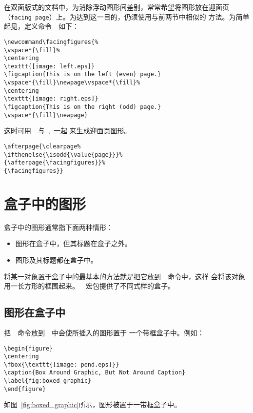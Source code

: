 在双面版式的文档中，为消除浮动图形间差别，常常希望将图形放在迎面页
（\texttt{facing page}）上。为达到这一目的，仍须使用与前两节中相似的
方法。为简单起见，定义命令~~如下：
\begin{Verbatim}[xleftmargin=1cm]
\newcommand\facingfigures{% 
\vspace*{\fill}% 
\centering 
\texttt{[image: left.eps]} 
\figcaption{This is on the left (even) page.} 
\vspace*{\fill}\newpage\vspace*{\fill}% 
\centering 
\texttt{[image: right.eps]} 
\figcaption{This is on the right (odd) page.} 
\vspace*{\fill}\newpage}
\end{Verbatim}
这时可用~~与~,~一起
来生成迎面页图形。
\begin{Verbatim}[xleftmargin=1cm]
\afterpage{\clearpage% 
\ifthenelse{\isodd{\value{page}}}% 
{\afterpage{\facingfigures}}% 
{\facingfigures}}
\end{Verbatim}

\section{盒子中的图形}

\noindent 盒子中的图形通常指下面两种情形：
\begin{itemize}
	\item 图形在盒子中，但其标题在盒子之外。
	\item 图形及其标题都在盒子中。
\end{itemize}

将某一对象置于盒子中的最基本的方法就是把它放到~~命令中，这样
会将该对象用一长方形的框围起来。~~宏包提供了不同式样的盒子。

\subsection{图形在盒子中}

把~~命令放到~~中会使所插入的图形置于
一个带框盒子中。例如：
\begin{Verbatim}[xleftmargin=1cm]
\begin{figure} 
\centering 
\fbox{\texttt{[image: pend.eps]}} 
\caption{Box Around Graphic, But Not Around Caption} 
\label{fig:boxed_graphic} 
\end{figure}
\end{Verbatim}
如图~\ref{fig:boxed_graphic}所示，图形被置于一带框盒子中。

